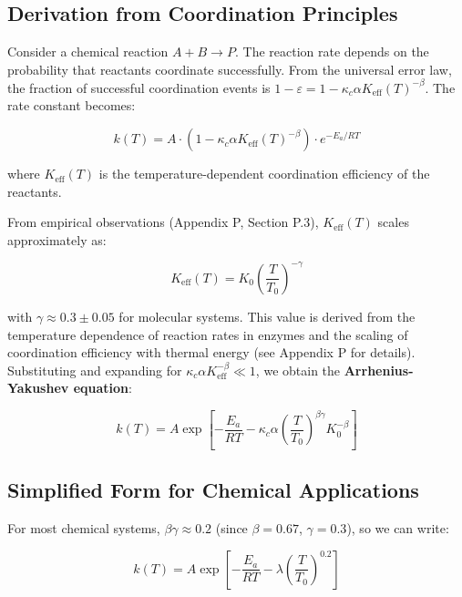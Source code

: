 \documentclass[12pt,a4paper]{article}
\theoremstyle{remark}
\newcommand{\Keff}{K_{\mathrm{eff}}}
\newcommand{\kappac}{\kappa_c}
\newcommand{\eps}{\varepsilon}
\begin{document}
	\subsection{Derivation from Coordination Principles}
	
	Consider a chemical reaction $A + B \rightarrow P$. The reaction rate depends on the probability that reactants coordinate successfully. From the universal error law, the fraction of successful coordination events is $1 - \eps = 1 - \kappac \alpha \Keff(T)^{-\beta}$. The rate constant becomes:
	
	\begin{equation}
		k(T) = A \cdot (1 - \kappac \alpha \Keff(T)^{-\beta}) \cdot e^{-E_a/RT}
		\label{eq:arrhenius-base}
	\end{equation}
	
	where $\Keff(T)$ is the temperature-dependent coordination efficiency of the reactants.
	
	From empirical observations (Appendix P, Section P.3), $\Keff(T)$ scales approximately as:
	
	\begin{equation}
		\Keff(T) = K_0 \left(\frac{T}{T_0}\right)^{-\gamma}
		\label{eq:K-T-scaling}
	\end{equation}
	
	with $\gamma \approx 0.3 \pm 0.05$ for molecular systems. This value is derived from the temperature dependence of reaction rates in enzymes and the scaling of coordination efficiency with thermal energy (see Appendix P for details). Substituting and expanding for $\kappac \alpha \Keff^{-\beta} \ll 1$, we obtain the \textbf{Arrhenius-Yakushev equation}:
	
	\begin{equation}
		\boxed{k(T) = A \exp\left[-\frac{E_a}{RT} - \kappac \alpha \left(\frac{T}{T_0}\right)^{\beta\gamma} K_0^{-\beta}\right]}
		\label{eq:arrhenius-yakushev}
	\end{equation}
	
	\subsection{Simplified Form for Chemical Applications}
	
	For most chemical systems, $\beta\gamma \approx 0.2$ (since $\beta = 0.67$, $\gamma = 0.3$), so we can write:
	
	\begin{equation}
		k(T) = A \exp\left[-\frac{E_a}{RT} - \lambda \left(\frac{T}{T_0}\right)^{0.2}\right]
		\label{eq:arrhenius-simple}
	\end{equation}
	
\end{document}
